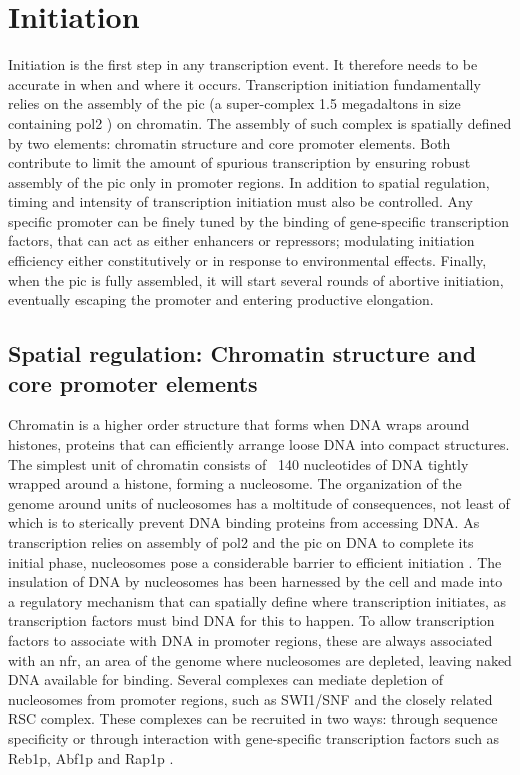\section{Initiation}

Initiation is the first step in any transcription event. 
It therefore needs to be accurate in when and where it occurs. 
Transcription initiation fundamentally relies on the assembly of the \gls{pic} (a super-complex 1.5 megadaltons in size  containing \gls{pol2} \cite{fazal:2015:realtime}) on chromatin.
The assembly of such complex is spatially defined by two elements: chromatin structure and core promoter elements.
Both contribute to limit the amount of spurious transcription by ensuring robust assembly of the \gls{pic} only in promoter regions.
In addition to spatial regulation, timing and intensity of transcription initiation must also be controlled.
Any specific promoter can be finely tuned by the binding of gene-specific transcription factors, that can act as either enhancers or repressors; modulating initiation efficiency either constitutively or in response to environmental effects. 
Finally, when the \gls{pic} is fully assembled, it will start several rounds of abortive initiation, eventually escaping the promoter and entering productive elongation.

\subsection{Spatial regulation: Chromatin structure and core promoter elements}

Chromatin is a higher order structure that forms when DNA wraps around histones, proteins that can efficiently arrange loose DNA into compact structures.
The simplest unit of chromatin consists of ~140 nucleotides of DNA tightly wrapped around a histone, forming a nucleosome.
The organization of the genome around units of nucleosomes has a moltitude of consequences, not least of which is to sterically prevent DNA binding proteins from accessing DNA. 
As transcription relies on assembly of \gls{pol2} and the \gls{pic} on DNA to complete its initial phase, nucleosomes pose a considerable barrier to efficient initiation \cite{field:2008:distinct} \cite{jiang:2009:compiled}.
The insulation of DNA by nucleosomes has been harnessed by the cell and made into a regulatory mechanism that can spatially define where transcription initiates, as transcription factors must bind DNA for this to happen. 
To allow transcription factors to associate with DNA in promoter regions, these are always associated with an \gls{nfr}, an area of the genome where nucleosomes are depleted, leaving naked DNA available for binding.
Several complexes can mediate depletion of nucleosomes from promoter regions, such as SWI1/SNF and the closely related RSC complex.
These complexes can be recruited in two ways: through sequence specificity or through interaction with gene-specific transcription factors such as Reb1p, Abf1p and Rap1p \citep{floer:2010:rscnucleosome, hartley:2009:mechanisms, spain:2014:rsc}.

